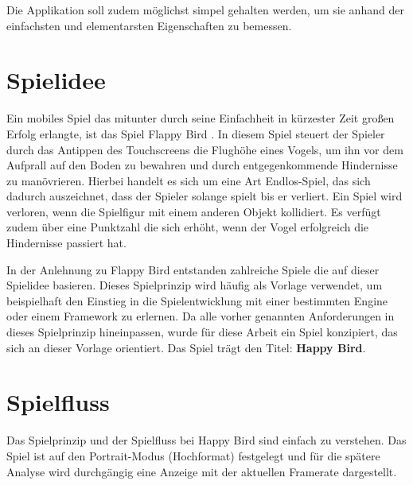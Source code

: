 Die Applikation soll zudem möglichst simpel gehalten werden, um sie anhand der einfachsten und elementarsten Eigenschaften zu bemessen.


\section{Spielidee}
Ein mobiles Spiel das mitunter durch seine Einfachheit in kürzester Zeit großen Erfolg erlangte, ist das Spiel Flappy Bird \citep{flappy_bird}.
In diesem Spiel steuert der Spieler durch das Antippen des Touchscreens die Flughöhe eines Vogels, um ihn vor dem Aufprall auf den Boden zu bewahren und durch entgegenkommende Hindernisse zu manövrieren. Hierbei handelt es sich um eine Art Endlos-Spiel, das sich dadurch auszeichnet, dass der Spieler solange spielt bis er verliert. Ein Spiel wird verloren, wenn die Spielfigur mit einem anderen Objekt kollidiert. Es verfügt zudem über eine Punktzahl die sich erhöht, wenn der Vogel erfolgreich die Hindernisse passiert hat.

\bigskip
In der Anlehnung zu Flappy Bird entstanden zahlreiche Spiele die auf dieser Spielidee basieren. Dieses Spielprinzip wird häufig als Vorlage verwendet, um beispielhaft den Einstieg in die Spielentwicklung mit einer bestimmten Engine oder einem Framework zu erlernen. Da alle vorher genannten Anforderungen in dieses Spielprinzip hineinpassen, wurde für diese Arbeit ein Spiel konzipiert, das sich an dieser Vorlage orientiert. Das Spiel trägt den Titel: \textbf{Happy Bird}. 

\section{Spielfluss}
Das Spielprinzip und der Spielfluss bei Happy Bird sind einfach zu verstehen. Das Spiel ist auf den Portrait-Modus (Hochformat) festgelegt und für die spätere Analyse wird durchgängig eine Anzeige mit der aktuellen Framerate dargestellt.


